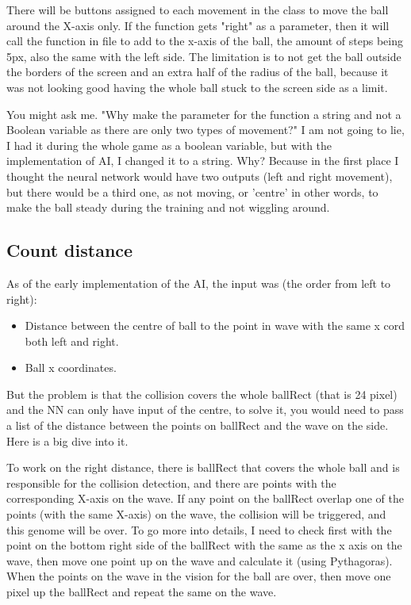 There will be buttons assigned to each movement in the class to move the ball around the X-axis only. If the function gets "right" as a parameter, then it will call the  function in  file to add to the x-axis of the ball, the amount of steps being 5px, also the same with the left side. The limitation is to not get the ball outside the borders of the screen and an extra half of the radius of the ball, because it was not looking good having the whole ball stuck to the screen side as a limit.

You might ask me. "Why make the parameter for the function a string and not a Boolean variable as there are only two types of movement?" I am not going to lie, I had it during the whole game as a boolean variable, but with the implementation of AI, I changed it to a string. Why? Because in the first place I thought the neural network would have two outputs (left and right movement), but there would be a third one, as not moving, or 'centre' in other words, to make the ball steady during the training and not wiggling around.

\subsection{Count distance}\label{sec:count-distance}
As of the early implementation of the AI, the input was (the order from left to right):
\begin{itemize}
\item Distance between the centre of ball to the point in wave with the same x cord both left and right.
\item Ball x coordinates.
\end{itemize}

But the problem is that the collision covers the whole ballRect (that is 24 pixel) and the NN can only have input of the centre, to solve it, you would need to pass a list of the distance between the points on ballRect and the wave on the side. Here is a big dive into it.

To work on the right distance, there is ballRect that covers the whole ball and is responsible for the collision detection, and there are points with the corresponding X-axis on the wave. If any point on the ballRect overlap one of the points (with the same X-axis) on the wave, the collision will be triggered, and this genome will be over. To go more into details, I need to check first with the point on the bottom right side of the ballRect with the same as the x axis on the wave, then move one point up on the wave and calculate it (using Pythagoras). When the points on the wave in the vision for the ball are over, then move one pixel up the ballRect and repeat the same on the wave.

